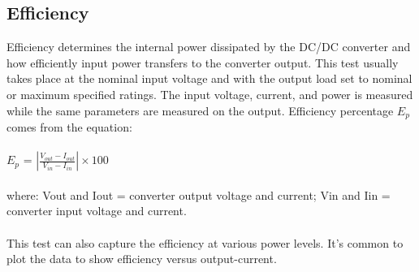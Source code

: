 \subsection{Efficiency} 

Efficiency determines the internal power dissipated by the DC/DC converter and how efficiently input power transfers to the converter output. This test usually takes place at the nominal input voltage and with the output load set to nominal or maximum specified ratings. The input voltage, current, and power is measured while the same parameters are measured on the output. Efficiency percentage $E_{p}$ comes from the equation:
\\ \\
\hspace*{5cm}$E_{p}$ = $\left | \frac{V_{out}-I_{out}}{V_{in}-I_{in}} \right | \times 100$
\\ \\
where:
Vout and Iout = converter output voltage and current;
Vin and Iin = converter input voltage and current.
\\ \\
This test can also capture the efficiency at various power levels. It’s common to plot the data to show efficiency versus output-current.

